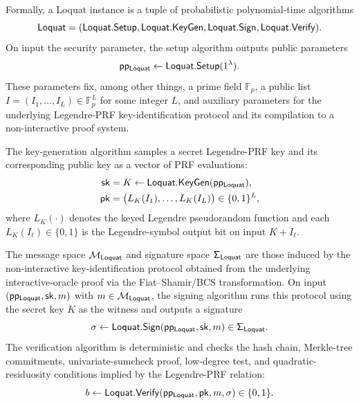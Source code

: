 Formally, a Loquat instance is a tuple of probabilistic polynomial-time algorithms
\begin{equation*}
  \mathsf{Loquat} = (\mathsf{Loquat}.\mathsf{Setup},\mathsf{Loquat}.\mathsf{KeyGen},\mathsf{Loquat}.\mathsf{Sign},\mathsf{Loquat}.\mathsf{Verify}).
\end{equation*}
On input the security parameter, the setup algorithm outputs public parameters
\begin{equation*}
  \mathsf{pp_{Loquat}} \leftarrow \mathsf{Loquat}.\mathsf{Setup}(1^\lambda).
\end{equation*}
These parameters fix, among other things, a prime field \(\mathbb{F}_p\), a public list \(I = (I_1,\ldots,I_L) \in \mathbb{F}_p^L\) for some integer \(L\), and auxiliary parameters for the underlying Legendre-PRF key-identification protocol and its compilation to a non-interactive proof system.

The key-generation algorithm samples a secret Legendre-PRF key and its corresponding public key as a vector of PRF evaluations:
\begin{equation*}
  \begin{aligned}
    \mathsf{sk} &= K \leftarrow \mathsf{Loquat}.\mathsf{KeyGen}(\mathsf{pp_{Loquat}}),
    \\
    \mathsf{pk} &= \bigl(L_K(I_1),\ldots,L_K(I_L)\bigr) \in \{0,1\}^L,
  \end{aligned}
\end{equation*}
where \(L_K(\cdot)\) denotes the keyed Legendre pseudorandom function and each \(L_K(I_\ell) \in \{0,1\}\) is the Legendre-symbol output bit on input \(K + I_\ell\).

The message space \(\mathsf{\mathcal{M}_{Loquat}}\) and signature space \(\mathsf{\Sigma_{Loquat}}\) are those induced by the non-interactive key-identification protocol obtained from the underlying interactive-oracle proof via the Fiat–Shamir/BCS transformation. On input \((\mathsf{pp_{Loquat}},\mathsf{sk},m)\) with \(m \in \mathsf{\mathcal{M}_{Loquat}}\), the signing algorithm runs this protocol using the secret key \(K\) as the witness and outputs a signature
\begin{equation*}
  \sigma \leftarrow \mathsf{Loquat}.\mathsf{Sign}(\mathsf{pp_{Loquat}},\mathsf{sk},m) \in \mathsf{\Sigma_{Loquat}}.
\end{equation*}
The verification algorithm is deterministic and checks the hash chain, Merkle-tree commitments, univariate-sumcheck proof, low-degree test, and quadratic-residuosity conditions implied by the Legendre-PRF relation:
\begin{equation*}
  b \leftarrow \mathsf{Loquat}.\mathsf{Verify}(\mathsf{pp_{Loquat}},\mathsf{pk},m,\sigma) \in \{0,1\}.
\end{equation*}

